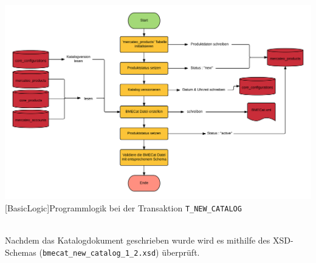 	\begin{minipage}{\linewidth}
		\vspace{1em}
		\centering
		\includegraphics[width=1 \linewidth]{img/newCatalogComplete}
		[BasicLogic]{Programmlogik  bei der Transaktion \texttt{T\_NEW\_CATALOG}}
		\vspace{1em}
	\end{minipage}\\
	
	Nachdem das Katalogdokument geschrieben wurde wird es mithilfe des  XSD-Schemas (\texttt{bmecat\_new\_catalog\_1\_2.xsd}) überprüft. 

